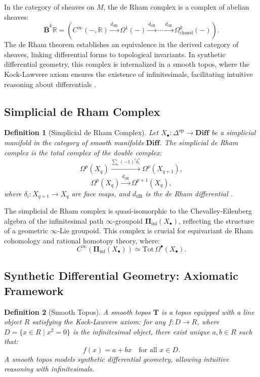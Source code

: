 \documentclass{article}
\theoremstyle{plain}
\newtheorem{definition}{Definition}[section]
\newcommand{\cat}[1]{\mathbf{#1}}
\newcommand{\op}{\mathrm{op}}
\newcommand{\dR}{\mathrm{dR}}
\begin{document}
In the category of sheaves on \(M\), the de Rham complex is a complex of abelian sheaves:
\[
\bar{\mathbf{B}}^k \mathbb{R} = (C^\infty(-, \mathbb{R}) \xrightarrow{d_{\dR}} \Omega^1(-) \xrightarrow{d_{\dR}} \cdots \xrightarrow{d_{\dR}} \Omega^k_{\mathrm{closed}}(-)).
\]
The de Rham theorem establishes an equivalence in the derived category of sheaves, linking differential forms to topological invariants. In synthetic differential geometry, this complex is internalized in a smooth topos, where the Kock-Lawvere axiom ensures the existence of infinitesimals, facilitating intuitive reasoning about differentials \cite{nLab_synthetic_diff_geom}.

\subsection{Simplicial de Rham Complex}

\begin{definition}[Simplicial de Rham Complex]
Let \(X_\bullet: \Delta^{\op} \to \cat{Diff}\) be a simplicial manifold in the category of smooth manifolds \(\cat{Diff}\). The \emph{simplicial de Rham complex} is the total complex of the double complex:
\[
\Omega^p(X_q) \xrightarrow{\sum_i (-1)^i \delta_i^*} \Omega^p(X_{q+1}),
\]
\[
\Omega^p(X_q) \xrightarrow{d_{\dR}} \Omega^{p+1}(X_q),
\]
where \(\delta_i: X_{q+1} \to X_q\) are face maps, and \(d_{\dR}\) is the de Rham differential \cite{nLab_simplicial_de_Rham}.
\end{definition}

The simplicial de Rham complex is quasi-isomorphic to the Chevalley-Eilenberg algebra of the infinitesimal path \(\infty\)-groupoid \(\mathbf{\Pi}_{\inf}(X_\bullet)\), reflecting the structure of a geometric \(\infty\)-Lie groupoid. This complex is crucial for equivariant de Rham cohomology and rational homotopy theory, where:
\[
C^\infty(\mathbf{\Pi}_{\inf}(X_\bullet)) \simeq \mathrm{Tot} \, \Omega^\bullet(X_\bullet).
\]

\subsection{Synthetic Differential Geometry: Axiomatic Framework}

\begin{definition}[Smooth Topos]
A \emph{smooth topos} \(\cat{T}\) is a topos equipped with a line
object \(R\) satisfying the Kock-Lawvere axiom: for any \(f: D \to R\),
where \(D = \{ x \in R \mid x^2 = 0 \}\) is the infinitesimal object,
there exist unique \(a, b \in R\) such that:
\[
f(x) = a + b x \quad \text{for all } x \in D.
\]
A smooth topos models synthetic differential geometry,
allowing intuitive reasoning with infinitesimals.
\end{definition}
\end{document}
